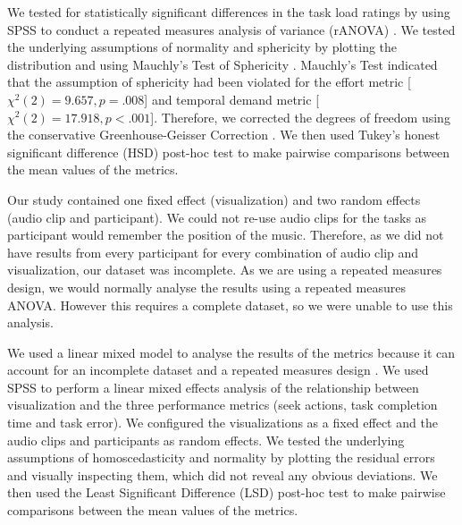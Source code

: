 We tested for statistically significant differences in the task load ratings by using SPSS to conduct a repeated
measures analysis of variance (rANOVA) \citep[p.~409]{Shalabh2009}.  We tested the underlying assumptions of normality
and sphericity by plotting the distribution and using Mauchly's Test of Sphericity \citep[p.~415]{Shalabh2009}.
Mauchly's Test indicated that the assumption of sphericity had been violated for the effort metric [$\chi^2(2) = 9.657,
p=.008$] and temporal demand metric [$\chi^2(2) = 17.918, p<.001$]. Therefore, we corrected the degrees of freedom
using the conservative Greenhouse-Geisser Correction \citep[p.~416]{Shalabh2009}.  We then used Tukey's honest
significant difference (HSD) post-hoc test \citep[p.~139]{Shalabh2009} to make pairwise comparisons between the mean
values of the metrics.

Our study contained one fixed effect (visualization) and two random effects (audio clip and participant).  We could not
re-use audio clips for the tasks as participant would remember the position of the music.  Therefore, as we did not
have results from every participant for every combination of audio clip and visualization, our dataset was incomplete.
As we are using a repeated measures design, we would normally analyse the results using a repeated measures ANOVA.
However this requires a complete dataset, so we were unable to use this analysis.

We used a linear mixed model to analyse the results of the metrics because it can account for an incomplete dataset and
a repeated measures design \citep{Gueorguieva2004}.  We used SPSS to perform a linear mixed effects analysis
\citep[p.~274]{Shalabh2009} of the relationship between visualization and the three performance metrics (seek actions,
task completion time and task error).  We configured the visualizations as a fixed effect and the audio clips and
participants as random effects. We tested the underlying assumptions of homoscedasticity and normality by plotting the
residual errors and visually inspecting them, which did not reveal any obvious deviations.
We then used the Least Significant Difference (LSD) post-hoc test \citep[p.~137]{Shalabh2009} to make pairwise
comparisons between the mean values of the metrics.


